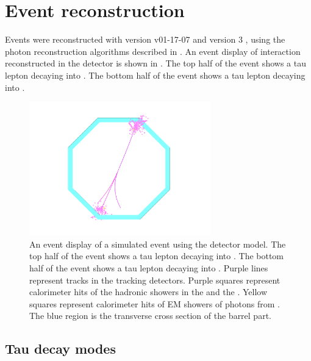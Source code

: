 \section{Event reconstruction}
\label{sec:tauReco}

Events were reconstructed with  \ilcsoft version v01-17-07 \cite{Gaede:82475} and \pandora version 3 \cite{Marshall:2015rfa}, using the photon reconstruction algorithms described in . An event display of \eeToTauTau interaction reconstructed in the \ILD detector is shown in . The top half of the event shows a tau lepton decaying into \decayRhoFinalState. The bottom half of the event shows a tau lepton decaying into \decayThreePionPhoton.



\begin{figure}[!tbph]
\centering
\includegraphics[width=0.7\textwidth]{tau/tau_evt_dsp3}
\caption{ An event display of a simulated \eeToTauTau event using the \ILD detector model. The top half of the event shows a tau lepton decaying into \decayRhoFinalState. The bottom half of the event shows a tau lepton decaying into \decayThreePionPhoton. Purple lines represent \Ppipm tracks in the tracking detectors. Purple squares represent  calorimeter hits of the \Ppipm hadronic showers in the \ECAL and the \HCAL. Yellow squares represent calorimeter hits of EM showers of photons  from \HepProcess{\Ppizero \to \Pphoton \Pphoton}. The blue region is the transverse cross section of the \ECAL barrel part.}
\label{fig:tauEvtDsp}
\end{figure}




\subsection{Tau  decay modes}

